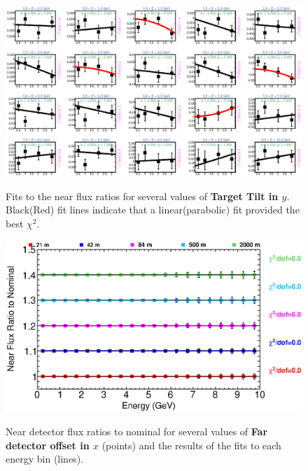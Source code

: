 {\begin{figure}[ht]
  \begin{center}
    {\includegraphics[width=5.0in]{figures/TargetYTilt_near_fits.eps}}
  \end{center}
\caption{ Fits to the near flux ratios for several values of {\bf Target Tilt in $y$}. Black(Red) fit lines indicate that a linear(parabolic) fit provided the best $\chi^2$. }
\end{figure}


\begin{figure}[ht]
  \begin{center}
    {\includegraphics[width=6.0in]{figures/LBNEFDX_near_summary.eps}}
  \end{center}
\caption{ Near detector flux ratios to nominal for several values of {\bf Far detector offset in $x$} (points) and the results of the fits to each energy bin (lines).}
\end{figure}

}

